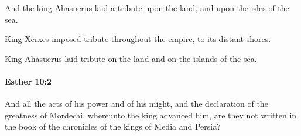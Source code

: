 			\begin{versebox}
					\item[BHS] 
					\item[LXX] 
					\item[ASV] And the king Ahasuerus laid a tribute upon the land, and upon the isles of the sea.
					\item[NIV] King Xerxes imposed tribute throughout the empire, to its distant shores.
					\item[NRSV] King Ahasuerus laid tribute on the land and on the islands of the sea.
			\end{versebox}

		\paragraph{Esther 10:2} %
			\label{ESTHER-10-2}

			And all the acts of his power and of his might, and the declaration of the greatness of Mordecai, whereunto the king advanced him, are they not written in the book of the chronicles of the kings of Media and Persia?

